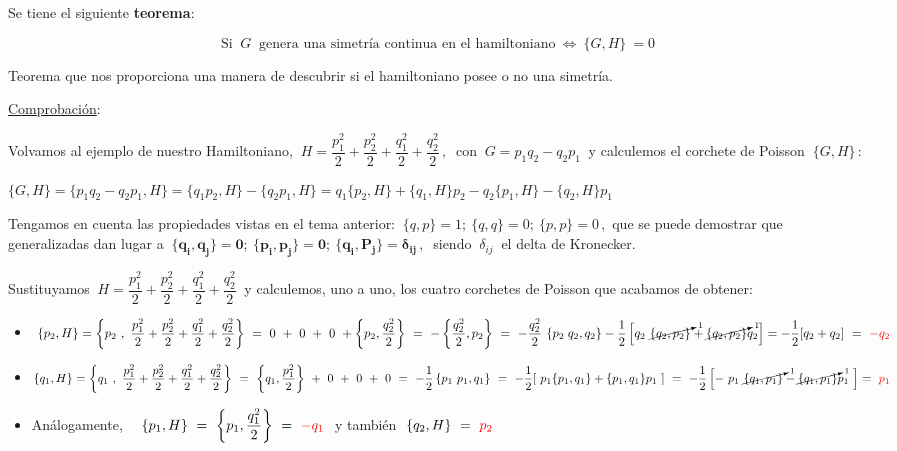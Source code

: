\vspace{5mm} Se tiene el siguiente \textbf{teorema}:

$$\text{Si }\  G \ \text{ genera una simetría continua en el hamiltoniano}  \ \Leftrightarrow \ \{G,H\} \ = 0$$

Teorema que nos proporciona una manera de descubrir si el hamiltoniano posee o no una simetría.

\underline{Comprobación}:

Volvamos al ejemplo de nuestro Hamiltoniano, $\ H=\dfrac {p_1^2} 2 + \dfrac {p_2^2} 2 + \dfrac {q_1^2} 2 + \dfrac {q_2^2} 2 \, , \  $ con $\ G=p_1q_2-q_2p_1 \ $ y calculemos el corchete de Poisson $\ \{G,H\}\, :$


$\{G,H \} = \{ p_1q_2-q_2p_1, H\} = \{q_1p_2,H\}-\{q_2p_1,H\}= q_1\{p_2,H\} + \{q_1,H\}p_2 - q_2\{p_1,H\} - \{q_2,H\}p_1 $

Tengamos en cuenta las propiedades vistas en el tema anterior: $\ \{q,p\}=1;\ \{q,q\}=0;\ \{p,p\}=0\, ,$ que se puede demostrar que generalizadas dan lugar a $ \  \boldsymbol{ \{q_i,q_j\}=0;\ \{p_i,p_j\}=0;\ \{q_i,P_j\}=\delta_{ij} } \, , \ $  siendo $ \ \delta_{ij} \ $ el delta de Kronecker. 

Sustituyamos $\ H=\dfrac {p_1^2} 2 + \dfrac {p_2^2} 2 + \dfrac {q_1^2} 2 + \dfrac {q_2^2} 2\ $ y calculemos, uno a uno, los cuatro corchetes de Poisson que acabamos de obtener:

\begin{itemize}
\item $\ \{p_2,H\}= \left\{p_2\ , \ \dfrac {p_1^2} 2 + \dfrac {p_2^2} 2 + \dfrac {q_1^2} 2 + \dfrac {q_2^2} 2 \right\} \ = \ 0 \ + \ 0 \ + \ 0 \ + \left\{p_2,\dfrac{q_2^2}2 \right\} \ = \ - \left\{\dfrac{q_2^2}2 , p_2 \right\}  \ = \ -\dfrac {q_2^2}{2} \ \{p_2\; q_2, q_2\}  -\dfrac 1 2 \left[ q_2 \ \cancelto{1}{ \{q_2,p_2\} } + \cancelto{1}{ \{q_2,p_2\} } q_2 \right] = -\dfrac 1 2 [q_2+q_2] \ = \ \textcolor{red}{-q_2}$	
\item $\{q_1,H\}=\left\{q_1\ , \ \dfrac {p_1^2} 2 + \dfrac {p_2^2} 2 + \dfrac {q_1^2} 2 + \dfrac {q_2^2} 2 \right\} \ = \ \left\{q_1,\dfrac{p_1^2}2 \right\} \ + \ 0 \ + \ 0 \ + \ 0  \ = \ - \dfrac 1 2  \left\{p_1\ p_1 , q_1 \right\}  \ = \ -\dfrac 1 2 [\ p_1\{p_1,q_1\} + \{p_1,q_1\}p_1 \ ] \ =  \ -\dfrac 1 2 \left[- \ p_1 \ \cancelto{1}{\{q_1,p_1\}} -  \cancelto{1}{\{q_1,p_1\}}p_1 \ \right]=\ \textcolor{red}{p_1} $
\item Análogamente, $\quad \{p_1,H\}\ = \ \left\{ p_1,\dfrac{q_1^2}{2} \right\}\ = \ \textcolor{red}{-q_1} \ $ y también  $ \ \{q_2,H\} \ = \ \textcolor{red}{p_2}$
\end{itemize}


